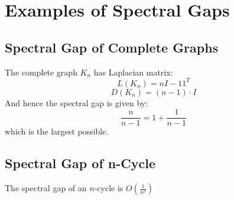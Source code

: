 \documentclass[11pt]{article}
\begin{document}
\section*{Examples of Spectral Gaps}

\subsection*{Spectral Gap of Complete Graphs}
The complete graph $K_n$ has Laplacian matrix:
\[
    L(K_n) = nI - 11^T
\]
\[
    D(K_n) = (n-1)\cdot I
\]
And hence the spectral gap is given by:
\[
    \frac{n}{n-1} = 1 + \frac{1}{n-1}
\]
which is the largest possible.

\subsection*{Spectral Gap of n-Cycle}
The spectral gap of an $n$-cycle is $O\left(\frac{1}{n^2}\right)$
\end{document}
